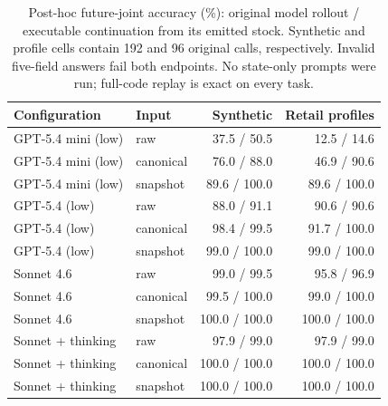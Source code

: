 \begin{table}[htbp]
\centering\small
\begin{tabular}{llrr}
\toprule
Configuration & Input & Synthetic & Retail profiles \\
\midrule
GPT-5.4 mini (low) & raw & 37.5 / 50.5 & 12.5 / 14.6 \\
GPT-5.4 mini (low) & canonical & 76.0 / 88.0 & 46.9 / 90.6 \\
GPT-5.4 mini (low) & snapshot & 89.6 / 100.0 & 89.6 / 100.0 \\
GPT-5.4 (low) & raw & 88.0 / 91.1 & 90.6 / 90.6 \\
GPT-5.4 (low) & canonical & 98.4 / 99.5 & 91.7 / 100.0 \\
GPT-5.4 (low) & snapshot & 99.0 / 100.0 & 99.0 / 100.0 \\
Sonnet 4.6 & raw & 99.0 / 99.5 & 95.8 / 96.9 \\
Sonnet 4.6 & canonical & 99.5 / 100.0 & 99.0 / 100.0 \\
Sonnet 4.6 & snapshot & 100.0 / 100.0 & 100.0 / 100.0 \\
Sonnet + thinking & raw & 97.9 / 99.0 & 97.9 / 99.0 \\
Sonnet + thinking & canonical & 100.0 / 100.0 & 100.0 / 100.0 \\
Sonnet + thinking & snapshot & 100.0 / 100.0 & 100.0 / 100.0 \\
\bottomrule
\end{tabular}
\caption{Post-hoc future-joint accuracy (\%): original model rollout / executable continuation from its emitted stock. Synthetic and profile cells contain 192 and 96 original calls, respectively. Invalid five-field answers fail both endpoints. No state-only prompts were run; full-code replay is exact on every task.}
\label{tab:continuationfull}
\end{table}
